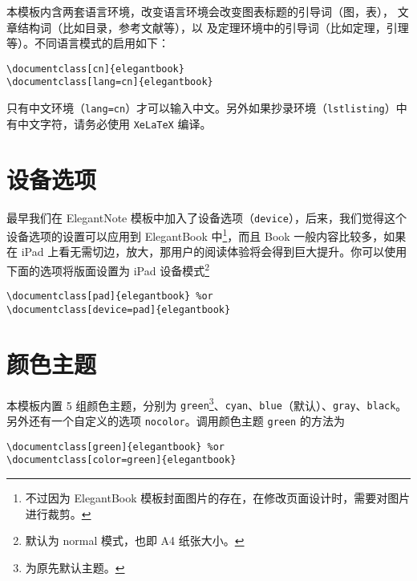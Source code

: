 \documentclass[cn,11pt]{elegantbook}
\begin{document}
本模板内含两套语言环境，改变语言环境会改变图表标题的引导词（图，表），
文章结构词（比如目录，参考文献等），以
及定理环境中的引导词（比如定理，引理等）。不同语言模式的启用如下：
\begin{lstlisting}
\documentclass[cn]{elegantbook} 
\documentclass[lang=cn]{elegantbook}
\end{lstlisting}

\begin{remark}
只有中文环境（\lstinline{lang=cn}）才可以输入中文。另外如果抄录环境（\lstinline{lstlisting}）中有中文字符，请务必使用 \lstinline{XeLaTeX} 编译。
\end{remark}

\section{设备选项}
最早我们在 ElegantNote 模板中加入了设备选项（\lstinline{device}），后来，我们觉得这个设备选项的设置可以应用到 ElegantBook 中\footnote{不过因为 ElegantBook 模板封面图片的存在，在修改页面设计时，需要对图片进行裁剪。}，而且 Book 一般内容比较多，如果在 iPad 上看无需切边，放大，那用户的阅读体验将会得到巨大提升。你可以使用下面的选项将版面设置为 iPad 设备模式\footnote{默认为 normal 模式，也即 A4 纸张大小。}
\begin{lstlisting}
\documentclass[pad]{elegantbook} %or
\documentclass[device=pad]{elegantbook}
\end{lstlisting}

\section{颜色主题}
本模板内置 5 组颜色主题，分别为 \textcolor{structure1}{\lstinline{green}}\footnote{为原先默认主题。}、\textcolor{structure2}{\lstinline{cyan}}、\textcolor{structure3}{\lstinline{blue}}（默认）、\textcolor{structure4}{\lstinline{gray}}、\textcolor{structure5}{\lstinline{black}}。另外还有一个自定义的选项  \lstinline{nocolor}。调用颜色主题 \lstinline{green} 的方法为 
\begin{lstlisting}
\documentclass[green]{elegantbook} %or
\documentclass[color=green]{elegantbook}
\end{lstlisting}
\end{document}
